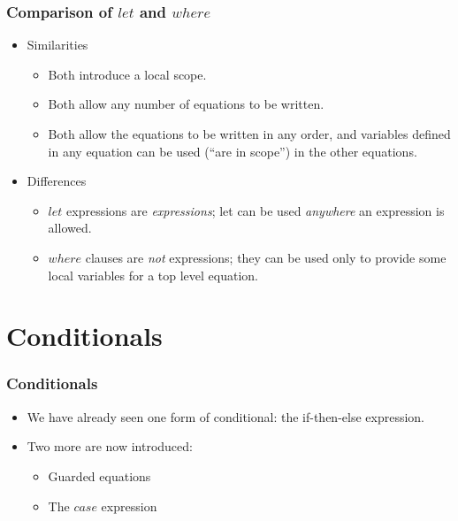 \documentclass{beamer}
\begin{document}
\begin{frame}[fragile]
\frametitle{Comparison of $let$ and $where$}

\begin{itemize}
\item Similarities
  \begin{itemize}
  \item Both introduce a local scope.
  \item Both allow any number of equations to be written.
  \item Both allow the equations to be written in any order, and
    variables defined in any equation can be used (``are in scope'')
    in the other equations.
  \end{itemize}
\item Differences
  \begin{itemize}
  \item $let$ expressions are \emph{expressions}; let can be used
    \emph{anywhere} an expression is allowed.
  \item $where$ clauses are \emph{not} expressions; they can be
    used only to provide some local variables for a top level
    equation.
  \end{itemize}
\end{itemize}

\end{frame}

\section{Conditionals}
\begin{frame}[fragile]
\frametitle{Conditionals}

\begin{itemize}
\item We have already seen one form of conditional: the
  if-then-else expression.
\item Two more are now introduced:
  \begin{itemize}
  \item Guarded equations
  \item The $case$ expression
  \end{itemize}
\end{itemize}

\end{frame}

\end{document}
